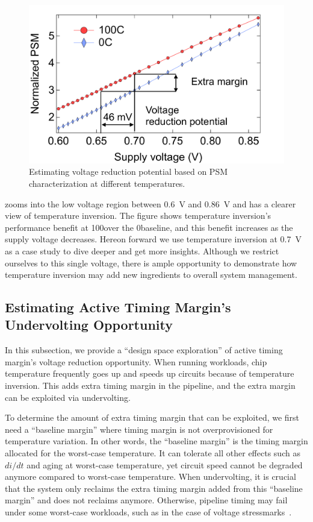 \begin{figure}
    \centering
    \includegraphics[trim=0 0 50 20,clip,width=.8\linewidth]{graphs/temperature/idle-psm-volt-nt.pdf}
    \caption{Estimating voltage reduction potential based on PSM characterization at different temperatures.}
    \label{fig:psm-nt}  
\end{figure}

 zooms into the low voltage region between 0.6~V and 0.86~V and has a clearer view of temperature inversion. The figure shows temperature inversion's performance benefit at 100\C over the 0\C baseline, and this benefit increases as the supply voltage decreases. Hereon forward we use temperature inversion at 0.7~V as a case study to dive deeper and get more insights. Although we restrict ourselves to this single voltage, there is ample opportunity to demonstrate how temperature inversion may add new ingredients to overall system management.

\subsection{Estimating Active Timing Margin's Undervolting Opportunity}
\label{sec:temperature:characterize:extrapolate}

In this subsection, we provide a ``design space exploration'' of active timing margin's voltage reduction opportunity. When running workloads, chip temperature frequently goes up and speeds up circuits because of temperature inversion. This adds extra timing margin in the pipeline, and the extra margin can be exploited via undervolting. 

To determine the amount of extra timing margin that can be exploited, we first need a ``baseline margin'' where timing margin is not overprovisioned for temperature variation. In other words, the ``baseline margin'' is the timing margin allocated for the worst-case temperature. It can tolerate all other effects such as $di/dt$ and aging at worst-case temperature, yet circuit speed cannot be degraded anymore compared to worst-case temperature. When undervolting, it is crucial that the system only reclaims the extra timing margin added from this ``baseline margin'' and does not reclaims anymore. Otherwise, pipeline timing may fail under some worst-case workloads, such as in the case of voltage stressmarks~\cite{kim2012audit,bertran2014voltage}. 

